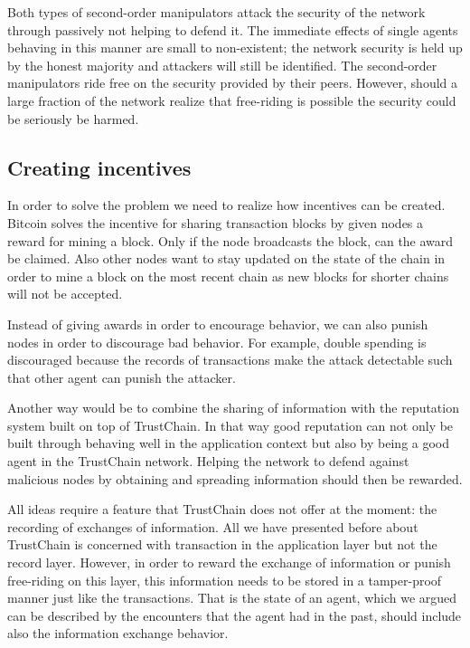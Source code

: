 Both types of second-order manipulators attack the security of the network through passively not 
helping to defend it. The immediate effects of single agents behaving in this manner are small to 
non-existent; the network security is held up by the honest majority and attackers will still be 
identified. The second-order manipulators ride free on the security provided by their peers. However,
should a large fraction of the network realize that free-riding is possible the security could be
seriously be harmed.

\subsection{Creating incentives}
In order to solve the problem we need to realize how incentives can be created. Bitcoin solves the 
incentive for sharing transaction blocks by given nodes a reward for mining a block. Only if the 
node broadcasts the block, can the award be claimed. Also other nodes want to stay updated on the 
state of the chain in order to mine a block on the most recent chain as new blocks for shorter chains
will not be accepted. 

Instead of giving awards in order to encourage behavior, we can also punish nodes in order to discourage
bad behavior. For example, double spending is discouraged because the records of transactions make 
the attack detectable such that other agent can punish the attacker. 

Another way would be to combine the sharing of information with the reputation system built on top 
of TrustChain. In that way good reputation can not only be built through behaving well in the 
application context but also by being a good agent in the TrustChain network. Helping the network to
defend against malicious nodes by obtaining and spreading information should then be rewarded. 

All ideas require a feature that TrustChain does not offer at the moment: the recording of exchanges
of information. All we have presented before about TrustChain is concerned with transaction in the 
application layer but not the record layer. However, in order to reward the exchange of information 
or punish free-riding on this layer, this information needs to be stored in a tamper-proof manner
just like the transactions. That is the state of an agent, which we argued can be described by the
encounters that the agent had in the past, should include also the information exchange behavior.

